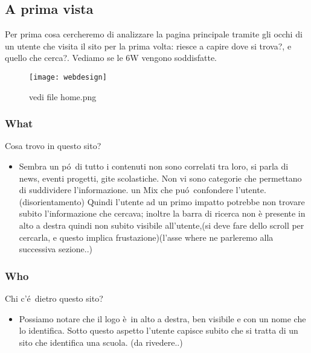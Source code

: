\documentclass[12pt]{article}
\begin{document}
\subsection{A prima vista}
Per prima cosa cercheremo di analizzare la pagina principale tramite gli occhi di un utente che visita il sito per la prima volta: riesce a capire dove si trova?, e quello che cerca?. Vediamo se le 6W vengono soddisfatte.

\begin{figure}[ht!]
\centering
\texttt{[image: webdesign]}
\caption{vedi file home.png}
\end{figure} 


\subsubsection{What} Cosa trovo in questo sito?
\begin{itemize}
	\item Sembra un p\'o\ di tutto i contenuti non sono correlati tra loro, si parla di news, eventi progetti, gite scolastiche. Non vi sono categorie che permettano di suddividere l'informazione. un Mix che pu\'o\ confondere l'utente.(disorientamento) Quindi l'utente ad un primo impatto potrebbe non trovare subito l'informazione che cercava; inoltre la barra di ricerca non è presente in alto a destra quindi non subito visibile all'utente,(si deve fare dello scroll per cercarla, e questo implica frustazione)(l'asse where ne parleremo alla successiva sezione..)
\end{itemize}
\subsubsection{Who} Chi c'\'e\ dietro questo sito?
\begin{itemize}
	\item Possiamo notare che il logo \`e\ in alto a destra, ben visibile e con un nome che lo identifica. Sotto questo aspetto l'utente capisce subito che si tratta di  un sito che identifica una scuola. (da rivedere..)
\end{itemize}
\end{document}
